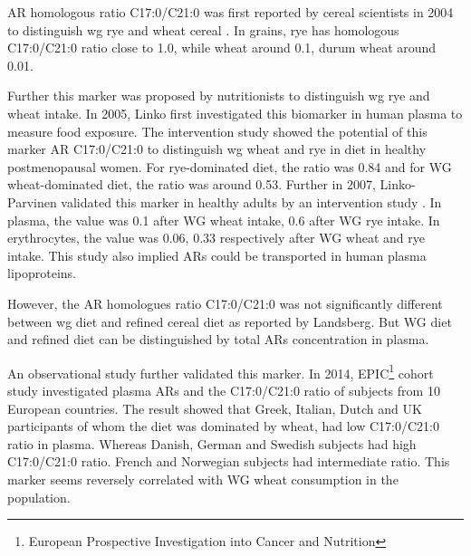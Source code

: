 AR homologous ratio C17:0/C21:0 was first reported by cereal scientists in 2004 to distinguish \acrshort{wg} rye and wheat cereal \cite{Chen2004}. In grains, rye has homologous C17:0/C21:0 ratio close to 1.0, while wheat around 0.1, durum wheat around 0.01.

Further this marker was proposed by nutritionists to distinguish \acrshort{wg} rye and wheat intake. In 2005, Linko\cite{ISI:000376712600013} first investigated this biomarker in human plasma to measure food exposure. The intervention study showed the potential of this marker AR C17:0/C21:0 to distinguish \acrshort{wg} wheat and rye in diet in healthy postmenopausal women. 
For rye-dominated diet, the ratio was 0.84 and for WG wheat-dominated diet, the ratio was around 0.53. 
Further in 2007, Linko-Parvinen validated this marker in healthy adults by an intervention study \cite{10.1093/jn/137.5.1137}.
In plasma, the value was 0.1 after WG wheat intake, 0.6 after WG rye intake. In erythrocytes, the value was 0.06, 0.33 respectively after WG wheat and rye intake. This study also implied ARs could be transported in human plasma lipoproteins.

However, the AR homologues ratio C17:0/C21:0 was not significantly different between \acrshort{wg} diet and refined cereal diet as reported by Landsberg\cite{ISI:000255012000007}. But WG diet and refined diet can be distinguished by total ARs concentration in plasma.

An observational study further validated this marker.
In 2014, EPIC\footnote{European Prospective Investigation into Cancer and Nutrition} cohort study investigated plasma ARs and the C17:0/C21:0 ratio of subjects from 10 European countries. 
The result showed that Greek, Italian, Dutch and UK participants of whom the diet was dominated by wheat, had low C17:0/C21:0 ratio in plasma. Whereas Danish, German and Swedish subjects had high C17:0/C21:0 ratio. French and Norwegian subjects had intermediate ratio. This marker seems reversely correlated with WG wheat consumption in the population.




